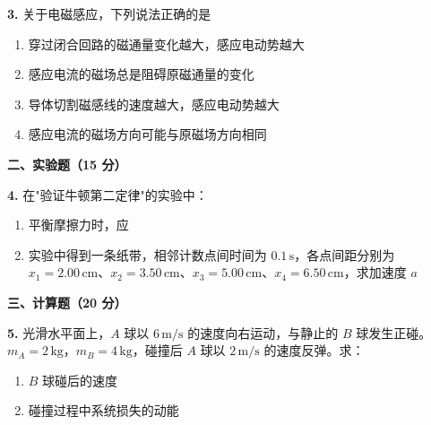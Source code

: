 \textbf{3.} 关于电磁感应，下列说法正确的是
\begin{enumerate}
  \item[A.] 穿过闭合回路的磁通量变化越大，感应电动势越大
  \item[B.] 感应电流的磁场总是阻碍原磁通量的变化
  \item[C.] 导体切割磁感线的速度越大，感应电动势越大
  \item[D.] 感应电流的磁场方向可能与原磁场方向相同
\end{enumerate}

\textbf{二、实验题（15 分）}

\textbf{4.} 在"验证牛顿第二定律"的实验中：
\begin{enumerate}
  \item 平衡摩擦力时，应 \underline{\hspace{3cm}}
  \item 实验中得到一条纸带，相邻计数点间时间为 $0.1\,\text{s}$，各点间距分别为 $x_1=2.00\,\text{cm}$、$x_2=3.50\,\text{cm}$、$x_3=5.00\,\text{cm}$、$x_4=6.50\,\text{cm}$，求加速度 $a$
\end{enumerate}

\textbf{三、计算题（20 分）}

\textbf{5.} 光滑水平面上，$A$ 球以 $6\,\text{m/s}$ 的速度向右运动，与静止的 $B$ 球发生正碰。$m_A = 2\,\text{kg}$，$m_B = 4\,\text{kg}$，碰撞后 $A$ 球以 $2\,\text{m/s}$ 的速度反弹。求：
\begin{enumerate}
  \item $B$ 球碰后的速度
  \item 碰撞过程中系统损失的动能
\end{enumerate}
